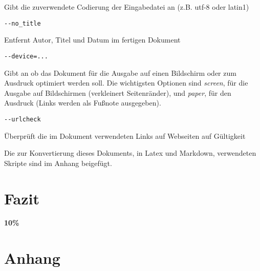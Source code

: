 \documentclass[%
oneside,                 %
final,                   %
chapterprefix=true,      %
open=right,              %
10pt]{book}
\begin{document}
Gibt die zuverwendete Codierung der Eingabedatei an (z.B. utf-8 oder latin1)

\begin{verbatim}
--no_title
\end{verbatim}

Entfernt Autor, Titel und Datum im fertigen Dokument

\begin{verbatim}
--device=...
\end{verbatim}

Gibt an ob das Dokument für die Ausgabe auf einen Bildschirm oder zum Ausdruck optimiert werden soll. Die wichtigsten Optionen sind \emph{screen}, für die Ausgabe auf Bildschirmen (verkleinert Seitenränder), und \emph{paper}, für den Ausdruck (Links werden als Fußnote ausgegeben).

\begin{verbatim}
--urlcheck
\end{verbatim}

Überprüft die im Dokument verwendeten Links auf Webseiten auf Gültigkeit

Die zur Konvertierung dieses Dokuments, in Latex und Markdown, verwendeten Skripte sind im Anhang beigefügt.
\chapter{Fazit}
\textbf{10\%}
\chapter{Anhang}
\end{document}
